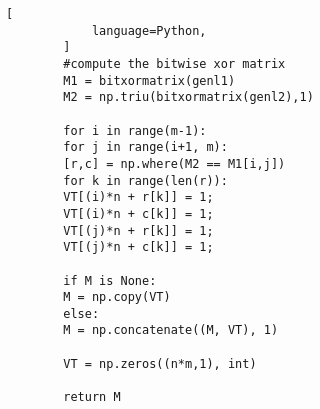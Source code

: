 \begin{appendix}
\begin{code}
\begin{lstlisting}[
            language=Python,
        ]
        #compute the bitwise xor matrix
        M1 = bitxormatrix(genl1)
        M2 = np.triu(bitxormatrix(genl2),1)
        
        for i in range(m-1):
        for j in range(i+1, m):
        [r,c] = np.where(M2 == M1[i,j])
        for k in range(len(r)):
        VT[(i)*n + r[k]] = 1;
        VT[(i)*n + c[k]] = 1;
        VT[(j)*n + r[k]] = 1;
        VT[(j)*n + c[k]] = 1;
        
        if M is None:
        M = np.copy(VT)
        else:
        M = np.concatenate((M, VT), 1)
        
        VT = np.zeros((n*m,1), int)
        
        return M
        \end{lstlisting}
        \caption{Python example}
    \end{code}
\end{appendix}